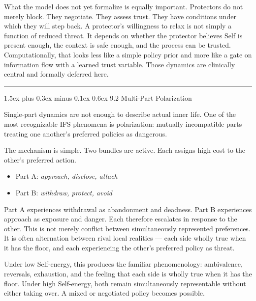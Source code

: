 \documentclass[12pt,a4paper]{article}
\makeatletter
\providecommand{\tightlist}{%
  \setlength{\itemsep}{0pt}\setlength{\parskip}{0pt}}
\renewcommand\subsubsection{\@startsection{subsubsection}{3}{0pt}%
  {1.5ex plus 0.3ex minus 0.1ex}%
  {0.6ex}%
  {\normalsize\itshape}}
\makeatother
\begin{document}
What the model does not yet formalize is equally important. Protectors
do not merely block. They negotiate. They assess trust. They have
conditions under which they will step back. A protector's willingness to
relax is not simply a function of reduced threat. It depends on whether
the protector believes Self is present enough, the context is safe
enough, and the process can be trusted. Computationally, that looks less
like a simple policy prior and more like a gate on information flow with
a learned trust variable. Those dynamics are clinically central and
formally deferred here.

\begin{center}\rule{0.5\linewidth}{0.5pt}\end{center}

\subsubsection{9.2 Multi-Part
Polarization}\label{multi-part-polarization}

Single-part dynamics are not enough to describe actual inner life. One
of the most recognizable IFS phenomena is polarization: mutually
incompatible parts treating one another's preferred policies as
dangerous.

The mechanism is simple. Two bundles are active. Each assigns high cost
to the other's preferred action.

\begin{itemize}
\tightlist
\item
  Part A: \emph{approach, disclose, attach}
\item
  Part B: \emph{withdraw, protect, avoid}
\end{itemize}

Part A experiences withdrawal as abandonment and deadness. Part B
experiences approach as exposure and danger. Each therefore escalates in
response to the other. This is not merely conflict between
simultaneously represented preferences. It is often alternation between
rival local realities --- each side wholly true when it has the floor,
and each experiencing the other's preferred policy as threat.

Under low Self-energy, this produces the familiar phenomenology:
ambivalence, reversals, exhaustion, and the feeling that each side is
wholly true when it has the floor. Under high Self-energy, both remain
simultaneously representable without either taking over. A mixed or
negotiated policy becomes possible.
\end{document}
